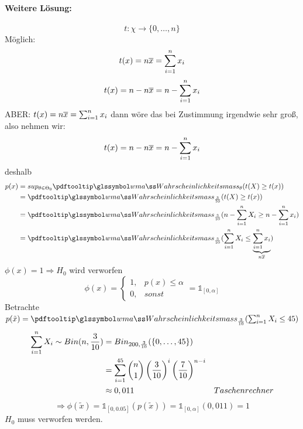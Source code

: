 \begin{auf}
    \paragraph{Weitere Lösung:}
    \[
        t : \chi \rightarrow \{0, \dots, n\}
    \]
    Möglich:
    \[
        t(x) = n \overline{x} = \sum_{i=1}^n x_i
    \]
    \[
        t(x) = n - n \overline{x} = n - \sum_{i=1}^n x_i
    \]
    ABER: $ t(x) = n \overline{x} = \sum_{i=1}^n x_i$ dann wöre das bei Zustimmung irgendwie sehr groß, also nehmen wir:
    \[
        t(x) = n - n \overline{x} = n - \sum_{i=1}^n x_i
    \]
    deshalb
    \begin{align*}
        p(x) & = sup_{\theta \in \Theta_0} \pe_{\theta}(t(X) \geq t(x)) \\
        & = \pe_{\frac{3}{10}} (t(X) \geq t(x)) \\
        & = \pe_{\frac{3}{10}} (n - \sumEN X_i \geq n - \sumEN x_i) \\
        & = \pe_{\frac{3}{10}} (\sumEN X_i \leq \underbrace{ \sumEN x_i}_{n \ol{x}}) \\
    \end{align*}
    $\phi(x) = 1 \Rightarrow H_0$ wird verworfen
    \[
        \phi(x) = \begin{cases}
                      1, & p(x) \leq \alpha \\ %
                      0, & sonst
        \end{cases} = \mathbb{1}_{[0, \alpha]}
    \]
    Betrachte $p(\tilde x) = \pe_{\frac{3}{10}} (\sumEN X_i \leq 45)$
    \begin{align*}
        \sum_{i=1}^n X_i \sim Bin(n, \frac{3}{10}) & = Bin_{200, \frac{3}{10}}(\{0, \dots, 45\}) \\
        & = \sum^{45}_{i = 1} \binom{n}{1} \left( \frac{3}{10} \right)^i \left( \frac{7}{10} \right)^{n-i} \\
        & \approx 0,011 & Taschenrechner
    \end{align*}
    \[
        \Rightarrow \phi(\tilde x) %
        = \mathbb{1}_{[0, 0.05]} (p(\tilde x)) %
        = \mathbb{1}_{[0, \alpha]} (0,011) = 1
    \]
    $H_0$ muss verworfen werden.
\end{auf}

